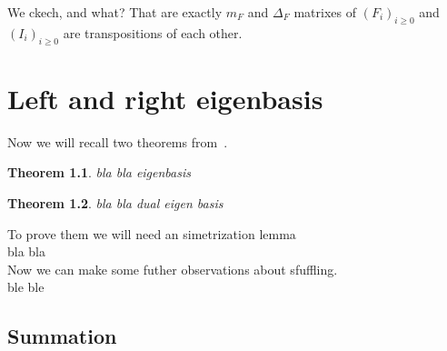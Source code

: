 \documentclass[a4paper, 12pt]{report}
\newtheorem{theorem}{Theorem}
\begin{document}
We ckech, and what? That are exactly $m_F$ and $\Delta_F$ matrixes of $(F_i)_{i \geq 0}$ and $(I_i)_{i 
\geq 0}$ 
are transpositions of each other.\\
\chapter{Left and right eigenbasis}
Now we will recall two theorems from~\cite{Diaconis2014}.
\begin{theorem}
bla bla eigenbasis
\end{theorem}
\begin{theorem}
bla bla dual eigen basis
\end{theorem}
To prove them we will need an simetrization lemma \\
bla bla\\[8pt]

Now we can make some futher observations about sfuffling.\\
ble ble\\

\section{Summation}


{}

\end{document}
